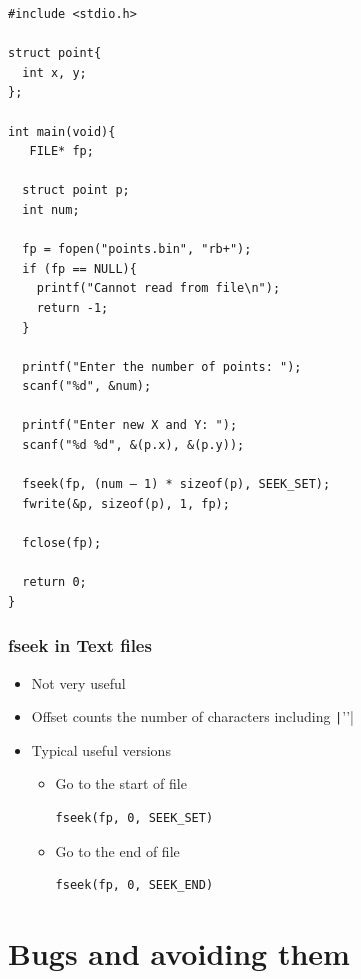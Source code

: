 \documentclass{../c-lecture}
\begin{document}
\begin{frame}[fragile]
  \begin{verbatim}
#include <stdio.h>

struct point{
  int x, y;
};

int main(void){
   FILE* fp;

  struct point p;
  int num;

  fp = fopen("points.bin", "rb+");
  if (fp == NULL){
    printf("Cannot read from file\n");
    return -1;
  }

  printf("Enter the number of points: ");
  scanf("%d", &num);

  printf("Enter new X and Y: ");
  scanf("%d %d", &(p.x), &(p.y));

  fseek(fp, (num – 1) * sizeof(p), SEEK_SET);
  fwrite(&p, sizeof(p), 1, fp);

  fclose(fp);

  return 0;
}
  \end{verbatim}
\end{frame}

\begin{frame}[fragile]
  \frametitle{fseek in Text files}
  \begin{itemize}
    \item Not very useful
    \item Offset counts the number of characters including \texttt|'\n'|
    \item Typical useful versions
    \begin{itemize}
      \item Go to the start of file
      \begin{verbatim}
fseek(fp, 0, SEEK_SET)
      \end{verbatim}
      \item Go to the end of file
      \begin{verbatim}
fseek(fp, 0, SEEK_END)
      \end{verbatim}
    \end{itemize}
  \end{itemize}
\end{frame}

\section{Bugs and avoiding them}
\end{document}
